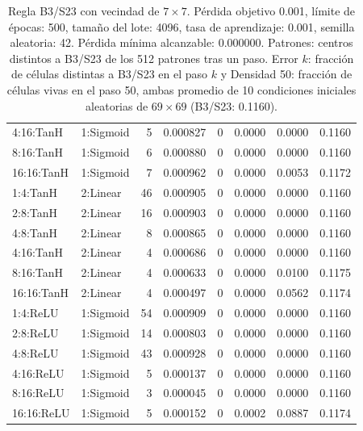 \begin{table}[H]
\begin{tabular}{llrrrrrr}
		4:16:TanH & 1:Sigmoid & 5 & 0.000827 & 0 & 0.0000 & 0.0000 & 0.1160 \\
		8:16:TanH & 1:Sigmoid & 6 & 0.000880 & 0 & 0.0000 & 0.0000 & 0.1160 \\
		16:16:TanH & 1:Sigmoid & 7 & 0.000962 & 0 & 0.0000 & 0.0053 & 0.1172 \\
		\midrule
		1:4:TanH & 2:Linear & 46 & 0.000905 & 0 & 0.0000 & 0.0000 & 0.1160 \\
		2:8:TanH & 2:Linear & 16 & 0.000903 & 0 & 0.0000 & 0.0000 & 0.1160 \\
		4:8:TanH & 2:Linear & 8 & 0.000865 & 0 & 0.0000 & 0.0000 & 0.1160 \\
		4:16:TanH & 2:Linear & 4 & 0.000686 & 0 & 0.0000 & 0.0000 & 0.1160 \\
		8:16:TanH & 2:Linear & 4 & 0.000633 & 0 & 0.0000 & 0.0100 & 0.1175 \\
		16:16:TanH & 2:Linear & 4 & 0.000497 & 0 & 0.0000 & 0.0562 & 0.1174 \\
		\midrule
		1:4:ReLU & 1:Sigmoid & 54 & 0.000909 & 0 & 0.0000 & 0.0000 & 0.1160 \\
		2:8:ReLU & 1:Sigmoid & 14 & 0.000803 & 0 & 0.0000 & 0.0000 & 0.1160 \\
		4:8:ReLU & 1:Sigmoid & 43 & 0.000928 & 0 & 0.0000 & 0.0000 & 0.1160 \\
		4:16:ReLU & 1:Sigmoid & 5 & 0.000137 & 0 & 0.0000 & 0.0000 & 0.1160 \\
		8:16:ReLU & 1:Sigmoid & 3 & 0.000045 & 0 & 0.0000 & 0.0000 & 0.1160 \\
		16:16:ReLU & 1:Sigmoid & 5 & 0.000152 & 0 & 0.0002 & 0.0887 & 0.1174 \\
		\bottomrule
	\end{tabular}
	\caption{Regla B3/S23 con vecindad de $7\times7$. Pérdida objetivo 0.001, límite de épocas: 500, tamaño del lote: 4096, tasa de aprendizaje: 0.001, semilla aleatoria: 42. Pérdida mínima alcanzable: 0.000000. Patrones: centros distintos a B3/S23 de los 512 patrones tras un paso. Error $k$: fracción de células distintas a B3/S23 en el paso $k$ y Densidad 50: fracción de células vivas en el paso 50, ambas promedio de 10 condiciones iniciales aleatorias de $69\times69$ (B3/S23: 0.1160).}
	\label{tab:vecindad_7x7}
\end{table}

